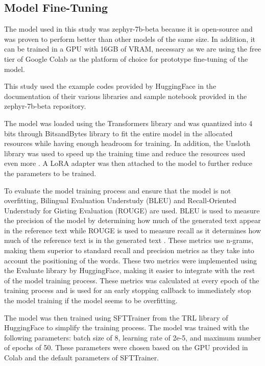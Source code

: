 \subsection{Model Fine-Tuning}
The model used in this study was zephyr-7b-beta because it is open-source and was proven to perform better than other models of the same size. In addition, it can be trained in a GPU with 16GB of VRAM, necessary as we are using the free tier of Google Colab as the platform of choice for prototype fine-tuning of the model.

This study used the example codes provided by HuggingFace in the documentation of their various libraries and sample notebook provided in the zephyr-7b-beta repository. 

The model was loaded using the Transformers library and was quantized into 4 bits through BitsandBytes library to fit the entire model in the allocated resources while having enough headroom for training. In addition, the Unsloth library was used to speed up the training time and reduce the resources used even more \cite{unsloth}. A LoRA adapter was then attached to the model to further reduce the parameters to be trained.

To evaluate the model training process and ensure that the model is not overfitting, Bilingual Evaluation Understudy (BLEU) and Recall-Oriented Understudy for Gisting Evaluation (ROUGE) are used. BLEU is used to measure the precision of the model by determining how much of the generated text appear in the reference text \cite{papineni_roukos_ward_zhu_2001} while ROUGE is used to measure recall as it determines how much of the reference text is in the generated text \cite{lin_2004}. These metrics use n-grams, making them superior to standard recall and precision metrics as they take into account the positioning of the words. These two metrics were implemented using the Evaluate library by HuggingFace, making it easier to integrate with the rest of the model training process. These metrics was calculated at every epoch of the training process and is used for an early stopping callback to immediately stop the model training if the model seems to be overfitting.

The model was then trained using SFTTrainer from the TRL library of HuggingFace to simplify the training process. The model was trained with the following parameters: batch size of 8, learning rate of 2e-5, and maximum number of epochs of 50. These parameters were chosen based on the GPU provided in Colab and the default parameters of SFTTrainer.

